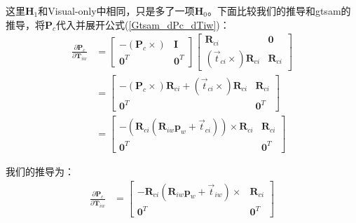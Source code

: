 \documentclass{article}
\begin{document}
这里$\boldsymbol{H}_1$和Visual-only中相同，只是多了一项$\boldsymbol{H}_0$。下面比较我们的推导和gtsam的推导，将$\boldsymbol{P}_c$代入并展开公式(\ref{Gtsam_dPc_dTiw})：
\begin{equation}
	\begin{aligned}
		\frac{\partial{\boldsymbol{P}_c}}{\partial{\boldsymbol{T}_{iw}}}                                    & =                   
		\left[          
		\begin{matrix}
		-(\boldsymbol{P}_c\times)                                                                           & \boldsymbol{I}      \\
		\boldsymbol{0}^T                                                                                    & \boldsymbol{0}^T    
		\end{matrix}
		\right]
		\left[                        
		\begin{matrix}
		\boldsymbol{R}_{ci}                                                                                 & \boldsymbol{0}      \\
		(\vec{t}_{ci}\times) \boldsymbol{R}_{ci}                                                            & \boldsymbol{R}_{ci} 
		\end{matrix}
		\right]\\&=
		\left[                        
		\begin{matrix}
		-(\boldsymbol{P}_c\times)\boldsymbol{R}_{ci}+(\vec{t}_{ci}\times) \boldsymbol{R}_{ci}               & \boldsymbol{R}_{ci} \\
		\boldsymbol{0}^T                                                                                    & \boldsymbol{0}^T    
		\end{matrix}
		\right]\\&=
		\left[
		\begin{matrix}
		-(\boldsymbol{R}_{ci}(\boldsymbol{R}_{iw}\boldsymbol{p}_w+ \vec{t}_{ci}))\times \boldsymbol{R}_{ci} & \boldsymbol{R}_{ci} \\
		\boldsymbol{0}^T                                                                                    & \boldsymbol{0}^T    
		\end{matrix}
		\right]
		\label{Gtsam_dPc_dTiw_2}
	\end{aligned}
\end{equation}

我们的推导为：
\begin{equation}
	\begin{aligned}
		\frac{\partial{\boldsymbol{P}_c}}{\partial{\boldsymbol{T}_{iw}}}               & =                   
		\left[
		\begin{matrix}
		-\boldsymbol{R}_{ci}(\boldsymbol{R}_{iw}  \boldsymbol{p}_w+\vec{t}_{iw})\times & \boldsymbol{R}_{ci} \\ 
		\boldsymbol{0}^T                                                               & \boldsymbol{0}^T    
		\end{matrix}
		\right] 
		\label{Gtsam_dPc_dTiw_Jin}
	\end{aligned}
\end{equation}
\end{document}
